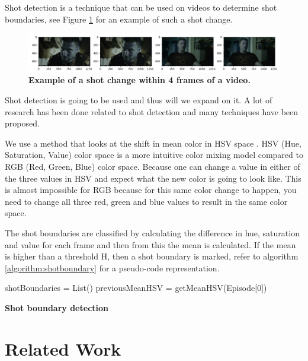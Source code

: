 \documentclass{article}
\begin{document}
Shot detection is a technique that can be used on videos to determine shot boundaries, see Figure \ref{shotchange} for an example of such a shot change. 

\begin{figure}[H]
	\includegraphics[width=12cm]{images/shotchange.jpg}
	\centering
	\caption{\textbf{Example of a shot change within 4 frames of a video.}}
	\label{shotchange}
\end{figure}

Shot detection is going to be used and thus will we expand on it. A lot of research has been done related to shot detection \cite{lienhart1998comparison} and many techniques have been proposed. 

We use a method that looks at the shift in mean color in HSV space \cite{shao2015shot}. HSV (Hue, Saturation, Value) color space is a more intuitive color mixing model compared to RGB (Red, Green, Blue) color space. Because one can change a value in either of the three values in HSV and expect what the new color is going to look like. This is almost impossible for RGB because for this same color change to happen, you need to change all three red, green and blue values to result in the same color space.

The shot boundaries are classified by calculating the difference in hue, saturation and value for each frame and then from this the mean is calculated. If the mean is higher than a threshold H, then a shot boundary is marked, refer to algorithm \ref{algorithm:shotboundary} for a pseudo-code representation.

\begin{algorithm}[H] 
	\SetAlgoLined
	shotBoundaries = List()\;
	previousMeanHSV = getMeanHSV(Episode[0])\;
	\caption{\textbf{Shot boundary detection}}
	\label{algorithm:shotboundary}
\end{algorithm}

\section{Related Work} \label{relatedwork}
\end{document}
